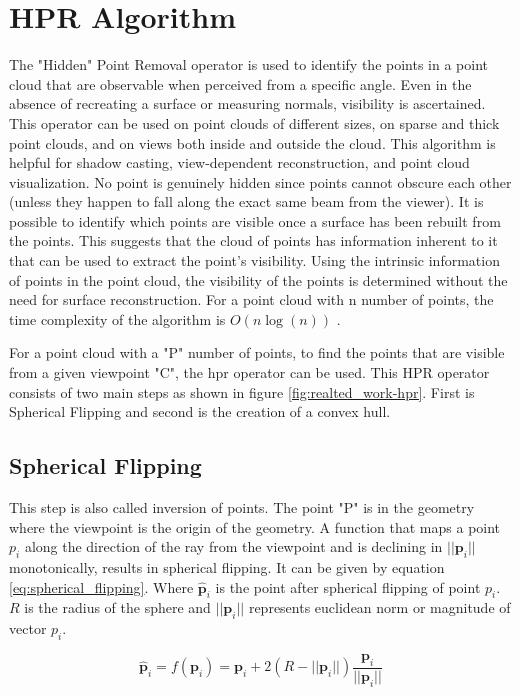 \section{HPR Algorithm}
The "Hidden" Point Removal operator \parencite{katz2007}is used to identify the points in a point cloud that are observable when perceived from a specific angle. Even in the absence of recreating a surface or measuring normals, visibility is ascertained.  This operator can be used on point clouds of different sizes, on sparse and thick point clouds, and on views both inside and outside the cloud. This algorithm is helpful for shadow casting, view-dependent reconstruction, and point cloud visualization. No point is genuinely hidden since points cannot obscure each other (unless they happen to fall along the exact same beam from the viewer). It is possible to identify which points are visible once a surface has been rebuilt from the points. This suggests that the cloud of points has information inherent to it that can be used to extract the point's visibility. Using the intrinsic information of points in the point cloud, the visibility of the points is determined without the need for surface reconstruction. For a point cloud with n number of points, the time complexity of the algorithm is \(O(n\log(n))\) \parencite{katz2007}.

For a point cloud with a "P" number of points, to find the points that are visible from a given viewpoint "C", the \acrshort{hpr} operator can be used. This HPR operator consists of two main steps as shown in figure \ref{fig:realted_work-hpr}. First is Spherical Flipping and second is the creation of a convex hull. 

\subsection{Spherical Flipping}
This step is also called inversion of points. The point "P" is in the geometry where the viewpoint is the origin of the geometry. A function that maps a point \(p_i\) along the direction of the ray from the viewpoint and is declining in \(||\mathbf{p}_i||\) monotonically, results in spherical flipping. It can be given by equation \ref{eq:spherical_flipping}. Where \(\hat{\mathbf{p}}_i \) is the point after spherical flipping of point \(p_i\). \(R\) is the radius of the sphere and \(||\mathbf{p}_i||\) represents euclidean norm or magnitude of vector \(p_i\).

\begin{equation}\label{eq:spherical_flipping}
\hat{\mathbf{p}}_i = f(\mathbf{p}_i) = \mathbf{p}_i + 2(R - ||\mathbf{p}_i||) \frac{\mathbf{p}_i}{||\mathbf{p}_i||}
\end{equation}



